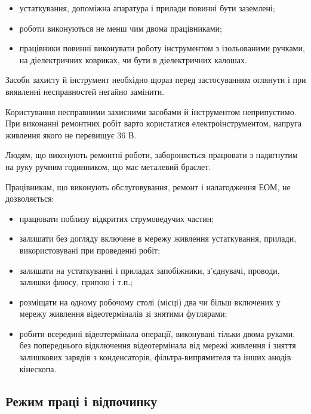 \documentclass[simple,a4paper,14pt,ukrainian,utf8]{eskdtext}
\begin{document}
\begin{appendices}
                \begin{itemize}
                    \item устаткування, допоміжна апаратура і прилади повинні бути заземлені;
                    \item роботи виконуються не менш чим двома працівниками;
                    \item працівники повинні виконувати роботу інструментом з ізольованими ручками, на діелектричних ковриках, чи бути в діелектричних калошах.
                \end{itemize}

                Засоби захисту й інструмент необхідно щораз перед застосуванням оглянути і при виявленні несправностей негайно замінити.

                Користування несправними захисними засобами й інструментом неприпустимо. При виконанні ремонтних робіт варто користатися електроінструментом, напруга живлення якого не перевищує 36 В.

                Людям, що виконують ремонтні роботи, забороняється працювати з надягнутим на руку ручним годинником, що має металевий браслет.

                Працівникам, що виконують обслуговування, ремонт і налагодження ЕОМ, не дозволяється:

                \begin{itemize}
                    \item працювати поблизу відкритих струмоведучих частин;
                    \item залишати без догляду включене в мережу живлення устаткування, прилади, використовувані при проведенні робіт;
                    \item залишати на устаткуванні і приладах запобіжники, з'єднувачі, проводи, залишки флюсу, припою і т.п.;
                    \item розміщати на одному робочому столі (місці) два чи більш включених у мережу живлення відеотерміналів зі знятими футлярами;
                    \item робити всередині відеотермінала операції, виконувані тільки двома руками, без попереднього відключення відеотермінала від мережі живлення і зняття залишкових зарядів з конденсаторів, фільтра-випрямителя та інших анодів кінескопа.
                \end{itemize}

            \subsection{Режим праці і відпочинку}


\end{appendices}
\end{document}
